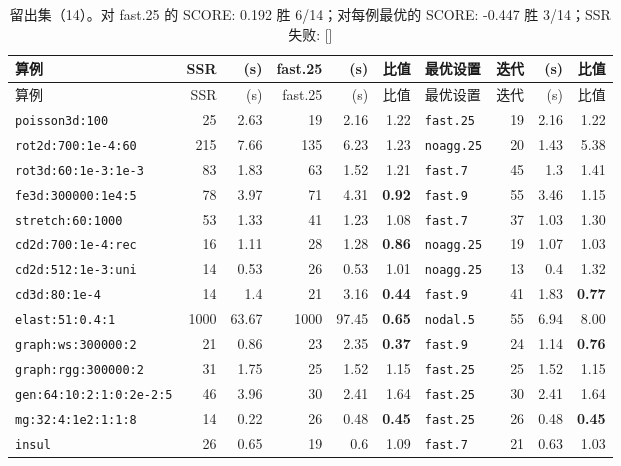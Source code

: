 {\scriptsize\setlength{\tabcolsep}{3pt}
\begin{longtable}{lrrrrrlrrr}
\caption{留出集（14）。对 fast.25 的 SCORE: 0.192  胜 6/14；对每例最优的 SCORE: -0.447  胜 3/14；SSR 失败: []}\\
\toprule
算例 & SSR & (s) & fast.25 & (s) & 比值 & 最优设置 & 迭代 & (s) & 比值 \\
\midrule
\endfirsthead
\toprule
算例 & SSR & (s) & fast.25 & (s) & 比值 & 最优设置 & 迭代 & (s) & 比值 \\
\midrule
\endhead
\bottomrule
\endlastfoot
\texttt{poisson3d:100} & 25 & 2.63 & 19 & 2.16 & 1.22 & \texttt{fast.25} & 19 & 2.16 & 1.22 \\
\texttt{rot2d:700:1e-4:60} & 215 & 7.66 & 135 & 6.23 & 1.23 & \texttt{noagg.25} & 20 & 1.43 & 5.38 \\
\texttt{rot3d:60:1e-3:1e-3} & 83 & 1.83 & 63 & 1.52 & 1.21 & \texttt{fast.7} & 45 & 1.3 & 1.41 \\
\texttt{fe3d:300000:1e4:5} & 78 & 3.97 & 71 & 4.31 & \textbf{0.92} & \texttt{fast.9} & 55 & 3.46 & 1.15 \\
\texttt{stretch:60:1000} & 53 & 1.33 & 41 & 1.23 & 1.08 & \texttt{fast.7} & 37 & 1.03 & 1.30 \\
\texttt{cd2d:700:1e-4:rec} & 16 & 1.11 & 28 & 1.28 & \textbf{0.86} & \texttt{noagg.25} & 19 & 1.07 & 1.03 \\
\texttt{cd2d:512:1e-3:uni} & 14 & 0.53 & 26 & 0.53 & 1.01 & \texttt{noagg.25} & 13 & 0.4 & 1.32 \\
\texttt{cd3d:80:1e-4} & 14 & 1.4 & 21 & 3.16 & \textbf{0.44} & \texttt{fast.9} & 41 & 1.83 & \textbf{0.77} \\
\texttt{elast:51:0.4:1} & 1000 & 63.67 & 1000 & 97.45 & \textbf{0.65} & \texttt{nodal.5} & 55 & 6.94 & 8.00 \\
\texttt{graph:ws:300000:2} & 21 & 0.86 & 23 & 2.35 & \textbf{0.37} & \texttt{fast.9} & 24 & 1.14 & \textbf{0.76} \\
\texttt{graph:rgg:300000:2} & 31 & 1.75 & 25 & 1.52 & 1.15 & \texttt{fast.25} & 25 & 1.52 & 1.15 \\
\texttt{gen:64:10:2:1:0:2e-2:5} & 46 & 3.96 & 30 & 2.41 & 1.64 & \texttt{fast.25} & 30 & 2.41 & 1.64 \\
\texttt{mg:32:4:1e2:1:1:8} & 14 & 0.22 & 26 & 0.48 & \textbf{0.45} & \texttt{fast.25} & 26 & 0.48 & \textbf{0.45} \\
\texttt{insul} & 26 & 0.65 & 19 & 0.6 & 1.09 & \texttt{fast.7} & 21 & 0.63 & 1.03 \\
\end{longtable}}
